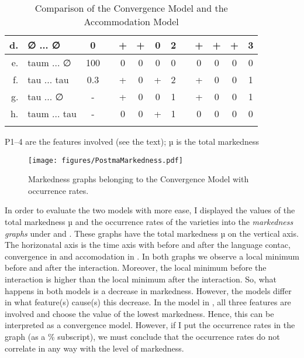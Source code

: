 \documentclass[output=paper,hidelinks,draftmode]{langscibook}
\begin{document}
\begin{table}
{\begin{tabular}{rlccccccccccc}
d. & ∅ ... ∅ & 0 & & + & + & 0 & 2 & & + & + & + & 3 \\
\midrule
e. & taum ... ∅ & 100 &  & \cellcolor[HTML]{E1E1E1}0 & \cellcolor[HTML]{E1E1E1}0 & \cellcolor[HTML]{E1E1E1}0 & \cellcolor[HTML]{E1E1E1}0 &  & \cellcolor[HTML]{E1E1E1}0 & \cellcolor[HTML]{E1E1E1}0 & \cellcolor[HTML]{E1E1E1}0 & \cellcolor[HTML]{E1E1E1}0 \\
f. & tau ... tau & 0.3 & & + & 0 & + & 2 & & + & 0 & 0 & 1 \\
g. & tau ... ∅ & - & & + & 0 & 0 & 1 & & + & 0 & 0 & 1 \\
h. & taum ... tau & - & & 0 & 0 & + & 1 & & \cellcolor[HTML]{E1E1E1}\cellcolor[HTML]{E1E1E1}0 & \cellcolor[HTML]{E1E1E1}0 & \cellcolor[HTML]{E1E1E1}0 & \cellcolor[HTML]{E1E1E1}0 \\
\lspbottomrule
\end{tabular}}
P1--4 are the features involved (see the text); µ is the total markedness
\caption{Comparison of the Convergence Model and the Accommodation Model}
\label{tab:postma:9}
\end{table}



\begin{figure}
\texttt{[image: figures/PostmaMarkedness.pdf]}
  \caption{
Markedness graphs belonging to the Convergence Model with occurrence rates. 
}\label{fig:postma:3}\end{figure}


In order to evaluate the two models with more ease, I displayed the values of the total markedness µ and the occurrence rates of the varieties into the \textit{markedness} \textit{graphs} under  and . These graphs have the total markedness µ on the vertical axis. The horizonatal axis is the time axis with before and after the language contac, convergence in  and accomodation in . In both graphs we observe a local minimum before and after the interaction. Moreover, the local minimum before the interaction is higher than the local minimum after the interaction. So, what happens in both models is a decrease in markedness. However, the models differ in what feature(s) cause(s) this decrease. In the model in , all three features are involved and choose the value of the lowest markedness. Hence, this can be interpreted as a convergence model. However, if I put the occurrence rates in the graph (as a \% subscript), we must conclude that the occurrence rates do not correlate in any way with the level of markedness.
\end{document}
